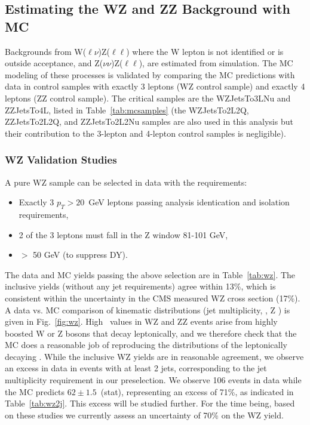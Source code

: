 \clearpage

\subsection{Estimating the WZ and ZZ Background with MC}
\label{sec:bkg_vz}

Backgrounds from W($\ell\nu$)Z($\ell\ell$) where the W lepton is not identified or is outside acceptance, and Z($\nu\nu$)Z($\ell\ell$),
are estimated from simulation. The MC modeling of these processes is validated by comparing the MC predictions with data in control samples
with exactly 3 leptons (WZ control sample) and exactly 4 leptons (ZZ control sample). 
The critical samples are the WZJetsTo3LNu and ZZJetsTo4L, listed in Table~\ref{tab:mcsamples}
(the WZJetsTo2L2Q, ZZJetsTo2L2Q, and ZZJetsTo2L2Nu samples are also used in this analysis but their contribution to the 3-lepton and 4-lepton
control samples is negligible).

\subsubsection{WZ Validation Studies}
\label{sec:bkg_wz}

A pure WZ sample can be selected in data with the requirements:

\begin{itemize}
\item Exactly 3 $p_T>20$~GeV leptons passing analysis identication and isolation requirements,
\item 2 of the 3 leptons must fall in the Z window 81-101 GeV,
\item \MET $>$ 50 GeV (to suppress DY).
\end{itemize}

The data and MC yields passing the above selection are in Table~\ref{tab:wz}. 
The inclusive yields (without any jet requirements) agree within 13\%, which is consistent within
the uncertainty in the CMS measured WZ cross section (17\%). A data vs. MC comparison of kinematic
distributions (jet multiplicity, \MET, Z \pt) is given in Fig.~\ref{fig:wz}. High \MET\ 
values in WZ and ZZ events arise from highly boosted W or Z bosons that decay leptonically, 
and we therefore check that the MC does a reasonable job of reproducing the \pt distributions of the 
leptonically decaying \Z. While the inclusive WZ yields are in reasonable agreement, we observe
an excess in data in events with at least 2 jets, corresponding to the jet multiplicity requirement
in our preselection. We observe 106 events in data while the MC predicts $62\pm1.5$~(stat), representing an excess of 71\%,
as indicated in Table~\ref{tab:wz2j}. 
This excess will be studied further. For the time being, based on these studies we currently assess an uncertainty of 70\% on the WZ yield.


